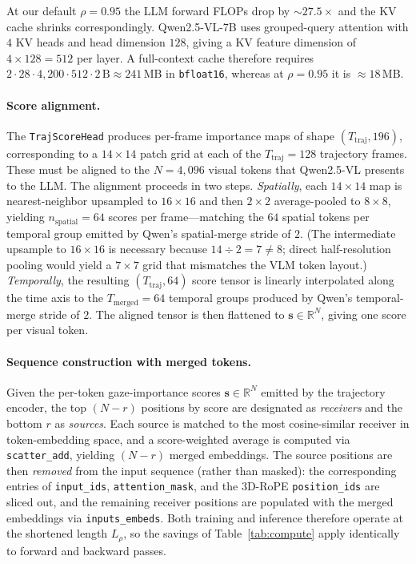 \noindent
At our default $\rho{=}0.95$ the LLM forward FLOPs drop by ${\sim}27.5\times$
and the KV cache shrinks correspondingly. Qwen2.5-VL-7B uses grouped-query
attention with $4$ KV heads and head dimension $128$, giving a KV feature
dimension of $4\times128{=}512$ per layer. A full-context cache therefore
requires $2\cdot 28 \cdot 4{,}200 \cdot 512 \cdot 2\,\text{B} \approx 241$\,MB
in \texttt{bfloat16}, whereas at $\rho{=}0.95$ it is ${\approx}18$\,MB.

\paragraph{Score alignment.}
The \texttt{TrajScoreHead} produces per-frame importance maps of shape
$(T_\text{traj}, 196)$, corresponding to a $14{\times}14$ patch grid at each of
the $T_\text{traj}{=}128$ trajectory frames. These must be aligned to the
$N{=}4{,}096$ visual tokens that Qwen2.5-VL presents to the LLM. The alignment
proceeds in two steps. \emph{Spatially}, each $14{\times}14$ map is
nearest-neighbor upsampled to $16{\times}16$ and then $2{\times}2$
average-pooled to $8{\times}8$, yielding $n_\text{spatial}{=}64$ scores per
frame—matching the $64$ spatial tokens per temporal group emitted by Qwen's
spatial-merge stride of $2$. (The intermediate upsample to $16{\times}16$ is
necessary because $14 \div 2 = 7 \neq 8$; direct half-resolution pooling would
yield a $7{\times}7$ grid that mismatches the VLM token layout.) \emph{Temporally}, the resulting
$(T_\text{traj}, 64)$ score tensor is linearly interpolated along the time axis
to the $T_\text{merged}{=}64$ temporal groups produced by Qwen's temporal-merge
stride of $2$. The aligned tensor is then flattened to
$\mathbf{s}\in\mathbb{R}^{N}$, giving one score per visual token.

\paragraph{Sequence construction with merged tokens.}
Given the per-token gaze-importance scores $\mathbf{s}\in\mathbb{R}^{N}$
emitted by the trajectory encoder, the top $(N-r)$ positions by score are
designated as \emph{receivers} and the bottom $r$ as \emph{sources}. Each
source is matched to the most cosine-similar receiver in token-embedding
space, and a score-weighted average is computed via \texttt{scatter\_add},
yielding $(N-r)$ merged embeddings. The source positions are then
\emph{removed} from the input sequence (rather than masked): the
corresponding entries of \texttt{input\_ids}, \texttt{attention\_mask}, and
the 3D-RoPE \texttt{position\_ids} are sliced out, and the remaining
receiver positions are populated with the merged embeddings via
\texttt{inputs\_embeds}. Both training and inference therefore operate at
the shortened length $L_\rho$, so the savings of Table~\ref{tab:compute}
apply identically to forward and backward passes.

